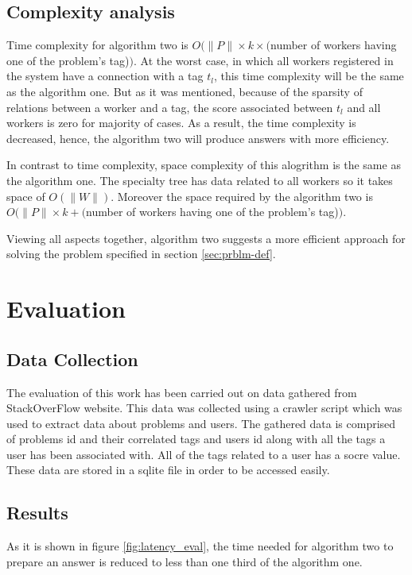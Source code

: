 \documentclass{template}
\begin{document}
\subsection{Complexity analysis}
Time complexity for algorithm two is 
\(O(\lVert P \rVert \times k \times (\)number of workers having one of the problem's tag)\()\).
At the worst case, in which all workers registered in the system have a connection with a tag \(t_l\),
this time complexity will be the same as the algorithm one. But as it was mentioned, because of the 
sparsity of relations between a worker and a tag, the score associated between \(t_l\) and all
workers is zero for majority of cases. As a result, the time complexity is decreased, hence, the 
algorithm two will produce answers with more efficiency.

In contrast to time complexity, space complexity of this alogrithm is the same as the algorithm one.
The specialty tree has data related to all workers so it takes space of \(O(\lVert W \rVert)\). 
Moreover the space required by the algorithm two is
\(O(\lVert P \rVert \times k + (\)number of workers having one of the problem's tag)\()\).

Viewing all aspects together, algorithm two suggests a more efficient approach for
solving the problem specified in section \ref{sec:prblm-def}.

\section{Evaluation}
\label{sec:eval}
\subsection{Data Collection}
The evaluation of this work has been carried out on data gathered from StackOverFlow website.
This data was collected using a crawler script which was used to extract data about problems
and users. The gathered data is comprised of problems id and their correlated tags and users id along
with all the tags a user has been associated with. All of the tags related to a user has a socre value.
These data are stored in a sqlite file in order to be accessed easily.

\subsection{Results}
As it is shown in figure \ref{fig:latency_eval}, the time needed for algorithm two to prepare 
an answer is reduced to less than one third of the algorithm one.
\end{document}
